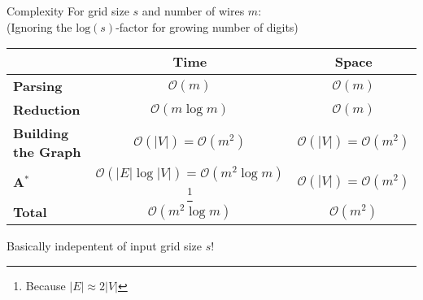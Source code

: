 \documentclass[aspectratio=169,xcolor=dvipsnames, t]{beamer}
\newcommand{\footnotestar}[1]{%
    \begingroup
    \renewcommand{\thefootnote}{\fnsymbol{footnote}}%
    \setcounter{footnote}{1}%
    \footnote{#1}%
    \endgroup
}
\begin{document}

\makefinalpage
\setcounter{framenumber}{10} %



\appendix
{}




\begin{frame}{Complexity}
    For grid size $s$ and number of wires $m$:\\
    {\footnotesize(Ignoring the $\mathrm{log}(s)$-factor for growing number of digits)\\}

    \begin{table}[h!]
        \centering
        \begin{tabular}{|l|c|c|}
            \cline{2-3}
            \multicolumn{1}{c|}{}       & \textbf{Time}                       & \textbf{Space}                    \\ \hline
            \textbf{Parsing}            & $\mathcal O(m)$                     & $\mathcal O(m)$                   \\ \hline
            \textbf{Reduction}          & $\mathcal O(m\log m)$               & $\mathcal O(m)$                   \\ \hline
            \textbf{Building the Graph} & $\mathcal O(|V|)=\mathcal O(m^2)$   & $\mathcal O(|V|)=\mathcal O(m^2)$ \\ \hline
            \textbf{A$\mathbf{^*}$}     & $\mathcal O(|E|\log|V|)=\mathcal O(m^2\log m)$\footnotestar{Because $|E|\approx2|V|$}   & $\mathcal O(|V|)=\mathcal O(m^2)$ \\ \hline
            \hline
            \textbf{Total}              & $\mathcal O(m^2\log m)$             & $\mathcal O(m^2)$                 \\ \hline
        \end{tabular}
    \end{table}
    Basically indepentent of input grid size $s$!
\end{frame}
\end{document}

